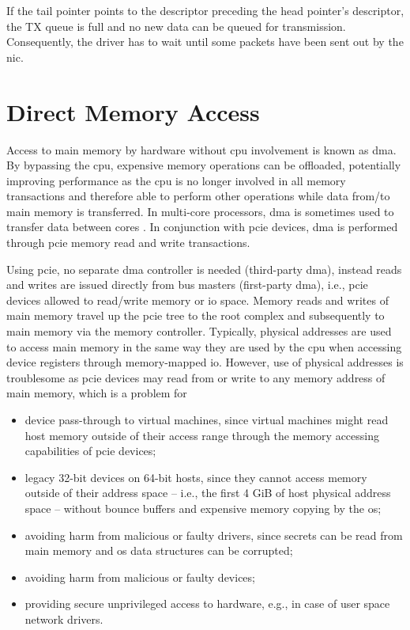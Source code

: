 If the tail pointer points to the descriptor preceding the head pointer's
descriptor, the TX queue is full and no new data can be queued for transmission.
Consequently, the driver has to wait until some packets have been sent out by
the \ac{nic}.


\section{Direct Memory Access}
\label{sec:dma}

Access to main memory by hardware without \ac{cpu} involvement is known as
\acf{dma}. By bypassing the \ac{cpu}, expensive memory operations can be
offloaded, potentially improving performance as the \ac{cpu} is no longer
involved in all memory transactions and therefore able to perform other
operations while data from/to main memory is transferred. In multi-core
processors, \ac{dma} is sometimes used to transfer data between cores
\cite{kistler2006cell}. In conjunction with \ac{pcie} devices, \ac{dma} is
performed through \ac{pcie} memory read and write transactions.

Using \ac{pcie}, no separate \ac{dma} controller is needed (third-party
\ac{dma}), instead reads and writes are issued directly from bus masters
(first-party \ac{dma}), i.e., \ac{pcie} devices allowed to read/write memory or
\ac{io} space. Memory reads and writes of main memory travel up the \ac{pcie}
tree to the root complex and subsequently to main memory via the memory
controller. Typically, physical addresses are used to access main memory in the
same way they are used by the \ac{cpu} when accessing device registers through
memory-mapped \ac{io}. However, use of physical addresses is troublesome as
\ac{pcie} devices may read from or write to any memory address of main memory,
which is a problem for

\begin{itemize}
    \item device pass-through to virtual machines, since virtual machines might
        read host memory outside of their access range through the memory
        accessing capabilities of \ac{pcie} devices;
    \item legacy 32-bit devices on 64-bit hosts, since they cannot access memory
        outside of their address space -- i.e., the first 4 GiB of host physical
        address space -- without bounce buffers and expensive memory copying by
        the \ac{os};
    \item avoiding harm from malicious or faulty drivers, since secrets can be
        read from main memory and \ac{os} data structures can be corrupted;
    \item avoiding harm from malicious or faulty devices;
    \item providing secure unprivileged access to hardware, e.g., in case of
        user space network drivers.
\end{itemize}

